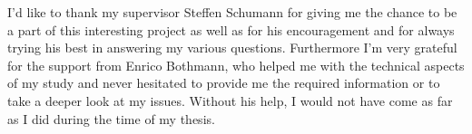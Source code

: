 
\setlength\parindent{0pt} 
\setlength\parskip{\medskipamount}

%
I'd like to thank my supervisor Steffen Schumann for giving me the chance to be a part of this interesting project as well as for his encouragement and for always trying his best in answering my various questions.
Furthermore I'm very grateful for the support from Enrico Bothmann, who helped me with the technical aspects of my study and never hesitated to provide me the required information or to take a deeper look at my issues.
Without his help, I would not have come as far as I did during the time of my thesis.

\cleardoublepage
